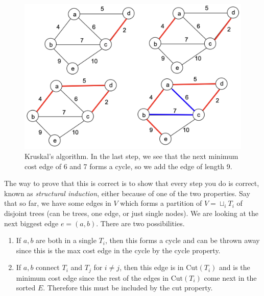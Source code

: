\documentclass{article}
\begin{document}
\begin{algo}
        \begin{figure}[H]
          \centering 
          \includegraphics[scale=0.4]{img/kruskal.png}
          \caption{Kruskal's algorithm. In the last step, we see that the next minimum cost edge of 6 and 7 forms a cycle, so we add the edge of length 9.} 
          \label{fig:kruskal}
        \end{figure}
      \end{algo}

      The way to prove that this is correct is to show that every step you do is correct, known as \textit{structural induction}, either because of one of the two properties. Say that so far, we have some edges in $V$ which forms a partition of $V = \sqcup_i T_i$ of disjoint trees (can be trees, one edge, or just single nodes). We are looking at the next biggest edge $e = (a, b)$. There are two possibilities. 
      \begin{enumerate}
        \item If $a, b$ are both in a single $T_i$, then this forms a cycle and can be thrown away since this is the max cost edge in the cycle by the cycle property. 
        \item If $a, b$ connect $T_i$ and $T_j$ for $i \neq j$, then this edge is in $\mathrm{Cut}(T_i)$ and is the minimum cost edge since the rest of the edges in $\mathrm{Cut}(T_i)$ come next in the sorted $E$. Therefore this must be included by the cut property. 
      \end{enumerate}
\end{document}
